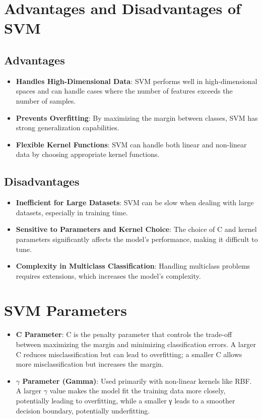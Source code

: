 \documentclass{article}
\begin{document}
	\section{Advantages and Disadvantages of SVM}
	
	\subsection{Advantages}
	
	\begin{itemize}
		\item \textbf{Handles High-Dimensional Data}: SVM performs well in high-dimensional spaces and can handle cases where the number of features exceeds the number of samples.
		\item \textbf{Prevents Overfitting}: By maximizing the margin between classes, SVM has strong generalization capabilities.
		\item \textbf{Flexible Kernel Functions}: SVM can handle both linear and non-linear data by choosing appropriate kernel functions.
	\end{itemize}
	
	\subsection{Disadvantages}
	
	\begin{itemize}
		\item \textbf{Inefficient for Large Datasets}: SVM can be slow when dealing with large datasets, especially in training time.
		\item \textbf{Sensitive to Parameters and Kernel Choice}: The choice of C and kernel parameters significantly affects the model's performance, making it difficult to tune.
		\item \textbf{Complexity in Multiclass Classification}: Handling multiclass problems requires extensions, which increases the model's complexity.
	\end{itemize}
	
	\section{SVM Parameters}
	
	\begin{itemize}
		\item \textbf{C Parameter}: C is the penalty parameter that controls the trade-off between maximizing the margin and minimizing classification errors. A larger C reduces misclassification but can lead to overfitting; a smaller C allows more misclassification but increases the margin.
		\item \textbf{$γ$ Parameter (Gamma)}: Used primarily with non-linear kernels like RBF. A larger $γ$ value makes the model fit the training data more closely, potentially leading to overfitting, while a smaller γ leads to a smoother decision boundary, potentially underfitting.
	\end{itemize}
	
\end{document}

